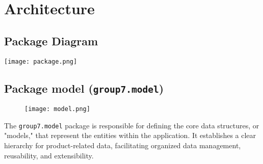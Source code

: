\documentclass{article}
\begin{document}
\section{Architecture}

\subsection*{Package Diagram}

\texttt{[image: package.png]}

\newpage
\subsection{Package model (\texttt{group7.model})}
\noindent
\begin{figure}[h!]
    \centering
    \texttt{[image: model.png]} %
\end{figure}

The \texttt{group7.model} package is responsible for defining the core data structures, or "models," that represent the entities within the application. It establishes a clear hierarchy for product-related data, facilitating organized data management, reusability, and extensibility.
\end{document}
